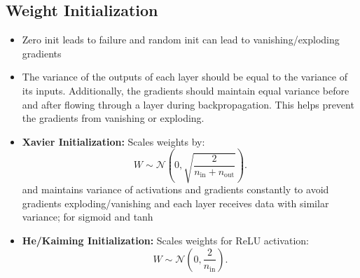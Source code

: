 \documentclass[12pt,a4paper]{article}
\begin{document}
\subsection{Weight Initialization}
\begin{itemize}
\item Zero init leads to failure and random init can lead to vanishing/exploding gradients 
\item The variance of the outputs of each layer should be equal to the variance of its inputs. Additionally, the gradients should maintain equal variance before and after flowing through a layer during backpropagation. This helps prevent the gradients from vanishing or exploding.

    \item \textbf{Xavier Initialization:} Scales weights by:
    \[ W \sim \mathcal{N}\left(0, \sqrt{\frac{2}{n_{\text{in}}+n_{\text{out}}}}\right). \]
    and maintains variance of activations and gradients constantly to avoid gradients exploding/vanishing and each layer receives data with similar variance; for sigmoid and tanh
    \item \textbf{He/Kaiming Initialization:} Scales weights for ReLU activation:
    \[ W \sim \mathcal{N}\left(0, \frac{2}{n_{\text{in}}}\right). \]
\end{itemize}
\end{document}
